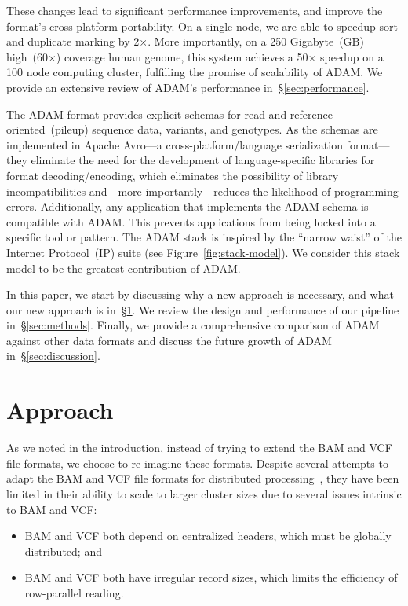 \documentclass{bioinfo}
\begin{document}
These changes lead to significant performance improvements, and improve the format's cross-platform portability. On a single
node, we are able to speedup sort and duplicate marking by 2$\times$. More importantly, on a 250 Gigabyte~(GB) high~(60$\times$) coverage
human genome, this system achieves a 50$\times$ speedup on a 100 node computing cluster, fulfilling the promise of scalability of ADAM.
We provide an extensive review of ADAM's performance in~\S\ref{sec:performance}.

The ADAM format provides explicit schemas for read and reference oriented~(pileup) sequence data, variants, and genotypes. As the schemas are implemented in Apache
Avro---a cross-platform/language serialization format---they eliminate the need for the development of language-specific libraries for format decoding/encoding, which
eliminates the possibility of library incompatibilities and---more importantly---reduces the likelihood of programming errors. Additionally, any application that implements the ADAM schema is
compatible with ADAM. This prevents applications from being locked into a specific tool or pattern. The ADAM stack is inspired by the ``narrow waist'' of the Internet
Protocol~(IP) suite (see Figure~\ref{fig:stack-model}). We consider this stack model to be the greatest contribution of ADAM.

In this paper, we start by discussing why a new approach is necessary, and what our new approach is in~\S\ref{sec:approach}. We review the
design and performance of our pipeline in~\S\ref{sec:methods}. Finally, we provide a comprehensive comparison of
ADAM against other data formats and discuss the future growth of ADAM in~\S\ref{sec:discussion}.

\section{Approach}
\label{sec:approach}

As we noted in the introduction, instead of trying to extend the BAM and VCF file formats, we choose to re-imagine these formats. Despite several attempts to adapt the
BAM and VCF file formats for distributed processing~\citep[see][]{niemenmaa12}, they have been limited in their ability to scale to larger cluster sizes due to several issues
intrinsic to BAM and VCF:

\begin{itemize}
\item BAM and VCF both depend on centralized headers, which must be globally distributed; and
\item BAM and VCF both have irregular record sizes, which limits the efficiency of row-parallel reading. 
\end{itemize}
\end{document}
